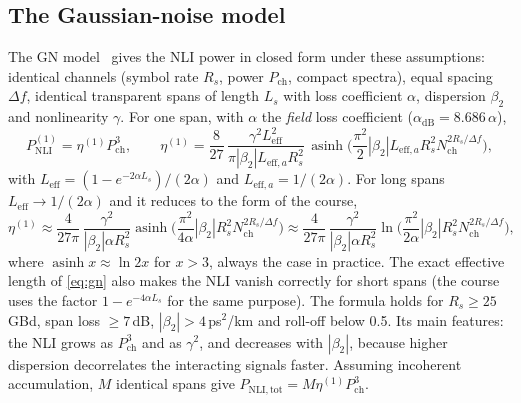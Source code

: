 \subsection{The Gaussian-noise model}
The GN model~\cite{poggiolini2012} gives the NLI power in closed form under these assumptions:
identical channels (symbol rate $R_s$, power $P_{\mathrm{ch}}$, compact spectra), equal spacing $\Delta f$, identical
transparent spans of length $L_s$ with loss coefficient $\alpha$, dispersion $\beta_2$ and nonlinearity $\gamma$. For
one span, with $\alpha$ the \emph{field} loss coefficient ($\alpha_{\mathrm{dB}}=8.686\,\alpha$),
\begin{equation}
  P^{(1)}_{\mathrm{NLI}}=\eta^{(1)}P_{\mathrm{ch}}^3,\qquad
  \eta^{(1)}=\frac{8}{27}\,\frac{\gamma^2L_{\mathrm{eff}}^2}{\pi|\beta_2|L_{\mathrm{eff},a}R_s^2}\,
  \operatorname{asinh}\Big(\frac{\pi^2}{2}|\beta_2|L_{\mathrm{eff},a}R_s^2N_{\mathrm{ch}}^{2R_s/\Delta f}\Big),
  \label{eq:gn}
\end{equation}
with $L_{\mathrm{eff}}=(1-e^{-2\alpha L_s})/(2\alpha)$ and $L_{\mathrm{eff},a}=1/(2\alpha)$. For long spans $L_{\mathrm{eff}}\to1/(2\alpha)$ and it reduces to the
form of the course,
\begin{equation}
  \eta^{(1)}\approx\frac{4}{27\pi}\,\frac{\gamma^2}{|\beta_2|\alpha R_s^2}\operatorname{asinh}\Big(\frac{\pi^2}{4\alpha}|\beta_2|R_s^2N_{\mathrm{ch}}^{2R_s/\Delta f}\Big)
  \approx\frac{4}{27\pi}\,\frac{\gamma^2}{|\beta_2|\alpha R_s^2}\ln\Big(\frac{\pi^2}{2\alpha}|\beta_2|R_s^2N_{\mathrm{ch}}^{2R_s/\Delta f}\Big),
\end{equation}
where $\operatorname{asinh}x\approx\ln2x$ for $x>3$, always the case in practice. The exact effective length of
\cref{eq:gn} also makes the NLI vanish correctly for short spans (the course uses the factor
$1-e^{-4\alpha L_s}$ for the same purpose). The formula holds for $R_s\ge25$\,GBd, span loss $\ge7$\,dB,
$|\beta_2|>4$\,ps$^2$/km and roll-off below 0.5. Its main features: the NLI grows as $P_{\mathrm{ch}}^3$ and as $\gamma^2$, and
decreases with $|\beta_2|$, because higher dispersion decorrelates the interacting signals faster.
Assuming incoherent accumulation, $M$ identical spans give $P_{\mathrm{NLI,tot}}=M\eta^{(1)}P_{\mathrm{ch}}^3$.

